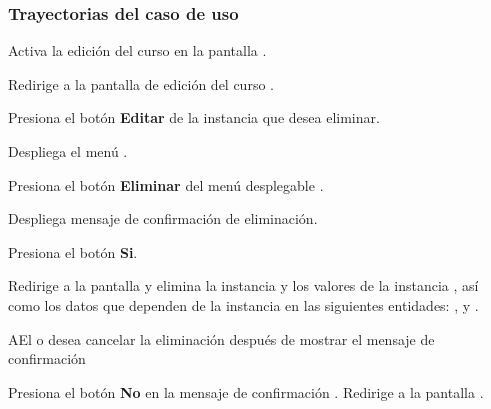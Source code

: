 \subsubsection{Trayectorias del caso de uso}

\begin{UCtrayectoria}%
%

    \Actor Activa la edición del curso en la pantalla .

    \Sistema Redirige a la pantalla de edición del curso .

    \Actor Presiona el botón {\bf Editar} de la instancia que desea eliminar.

    \Sistema Despliega el menú .

    \Actor Presiona el botón {\bf Eliminar} del menú desplegable .

    \Sistema Despliega mensaje de confirmación de eliminación. 

    \Actor Presiona el botón {\bf Si}. 

    \Sistema Redirige a la pantalla  y elimina la instancia y los valores de la instancia , así como los datos que dependen de la instancia en las siguientes entidades: ,  y .

\end{UCtrayectoria}

\begin{UCtrayectoriaA}{A}{El  o  desea cancelar la eliminación después de mostrar el mensaje de confirmación}

  \Actor Presiona el botón {\bf No} en la mensaje de confirmación .
  \Sistema Redirige a la pantalla .

\end{UCtrayectoriaA}
